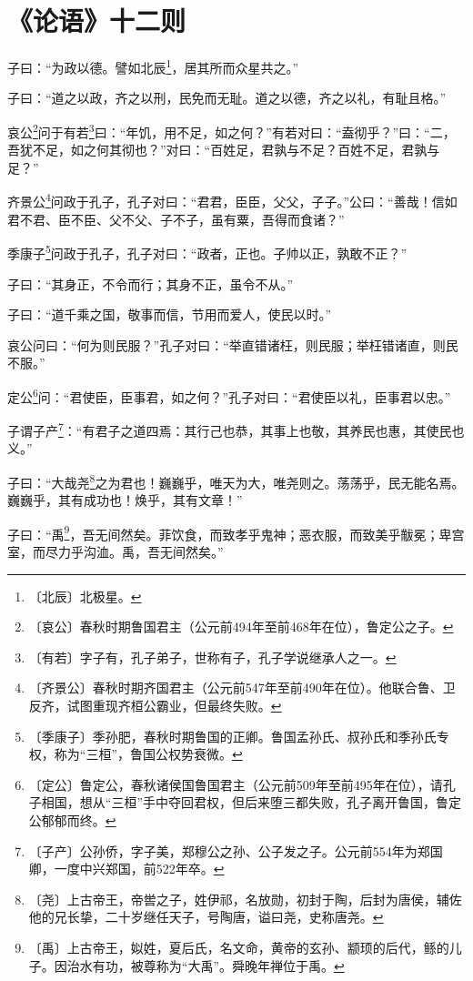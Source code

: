 \documentclass[12pt,UTF-8,openany]{ctexbook}
\begin{document}
\chapter{《论语》十二则}

\begin{normalsize}
    
    子曰：“为政以德。譬如北辰\footnote{〔北辰〕北极星。}，居其所而众星共之。”
    
    子曰：“道之以政，齐之以刑，民免而无耻。道之以德，齐之以礼，有耻且格。”
    
    哀公\footnote{〔哀公〕春秋时期鲁国君主（公元前494年至前468年在位），鲁定公之子。}问于有若\footnote{〔有若〕字子有，孔子弟子，世称有子，孔子学说继承人之一。}曰：“年饥，用不足，如之何？”有若对曰：“盍彻乎？”曰：“二，吾犹不足，如之何其彻也？”对曰：“百姓足，君孰与不足？百姓不足，君孰与足？”
    
    齐景公\footnote{〔齐景公〕春秋时期齐国君主（公元前547年至前490年在位）。他联合鲁、卫反齐，试图重现齐桓公霸业，但最终失败。}问政于孔子，孔子对曰：“君君，臣臣，父父，子子。”公曰：“善哉！信如君不君、臣不臣、父不父、子不子，虽有粟，吾得而食诸？”
    
    季康子\footnote{〔季康子〕季孙肥，春秋时期鲁国的正卿。鲁国孟孙氏、叔孙氏和季孙氏专权，称为“三桓”，鲁国公权势衰微。}问政于孔子，孔子对曰：“政者，正也。子帅以正，孰敢不正？”
    
    子曰：“其身正，不令而行；其身不正，虽令不从。”
    
    子曰：“道千乘之国，敬事而信，节用而爱人，使民以时。”
    
    哀公问曰：“何为则民服？”孔子对曰：“举直错诸枉，则民服；举枉错诸直，则民不服。”
    
    定公\footnote{〔定公〕鲁定公，春秋诸侯国鲁国君主（公元前509年至前495年在位），请孔子相国，想从“三桓”手中夺回君权，但后来堕三都失败，孔子离开鲁国，鲁定公郁郁而终。}问：“君使臣，臣事君，如之何？”孔子对曰：“君使臣以礼，臣事君以忠。”
    
    子谓子产\footnote{〔子产〕公孙侨，字子美，郑穆公之孙、公子发之子。公元前554年为郑国卿，一度中兴郑国，前522年卒。}：“有君子之道四焉：其行己也恭，其事上也敬，其养民也惠，其使民也义。”
    
    子曰：“大哉尧\footnote{〔尧〕上古帝王，帝喾之子，姓伊祁，名放勋，初封于陶，后封为唐侯，辅佐他的兄长挚，二十岁继任天子，号陶唐，谥曰尧，史称唐尧。}之为君也！巍巍乎，唯天为大，唯尧则之。荡荡乎，民无能名焉。巍巍乎，其有成功也！焕乎，其有文章！”
    
    子曰：“禹\footnote{〔禹〕上古帝王，姒姓，夏后氏，名文命，黄帝的玄孙、颛顼的后代，鲧的儿子。因治水有功，被尊称为“大禹”。舜晚年禅位于禹。}，吾无间然矣。菲饮食，而致孝乎鬼神；恶衣服，而致美乎黻冕；卑宫室，而尽力乎沟洫。禹，吾无间然矣。”
\end{normalsize}
\end{document}
